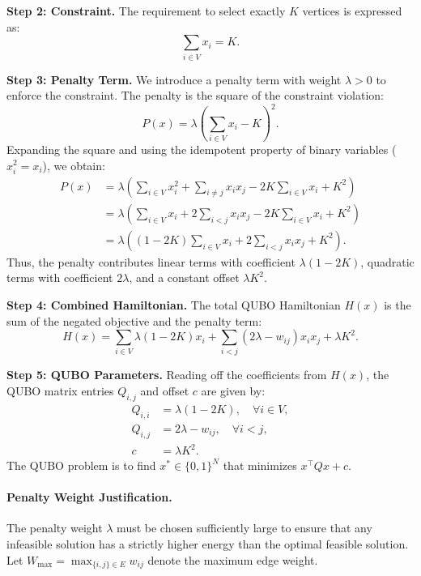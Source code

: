 \documentclass[12pt]{article}
\begin{document}
\textbf{Step 2: Constraint.}
The requirement to select exactly $K$ vertices is expressed as:
\begin{equation}
    \sum_{i \in V} x_i = K.
\end{equation}

\textbf{Step 3: Penalty Term.}
We introduce a penalty term with weight $\lambda > 0$ to enforce the constraint. The penalty is the square of the constraint violation:
\begin{equation}
    P(x) = \lambda \left( \sum_{i \in V} x_i - K \right)^2.
\end{equation}
Expanding the square and using the idempotent property of binary variables ($x_i^2 = x_i$), we obtain:
\begin{align}
    P(x) &= \lambda \left( \sum_{i \in V} x_i^2 + \sum_{i \neq j} x_i x_j - 2K \sum_{i \in V} x_i + K^2 \right) \\
    &= \lambda \left( \sum_{i \in V} x_i + 2 \sum_{i < j} x_i x_j - 2K \sum_{i \in V} x_i + K^2 \right) \\
    &= \lambda \left( (1 - 2K) \sum_{i \in V} x_i + 2 \sum_{i < j} x_i x_j + K^2 \right).
\end{align}
Thus, the penalty contributes linear terms with coefficient $\lambda(1 - 2K)$, quadratic terms with coefficient $2\lambda$, and a constant offset $\lambda K^2$.

\textbf{Step 4: Combined Hamiltonian.}
The total QUBO Hamiltonian $H(x)$ is the sum of the negated objective and the penalty term:
\begin{equation}
    H(x) = \sum_{i \in V} \lambda(1 - 2K) x_i + \sum_{i < j} \left( 2\lambda - w_{ij} \right) x_i x_j + \lambda K^2.
\end{equation}

\textbf{Step 5: QUBO Parameters.}
Reading off the coefficients from $H(x)$, the QUBO matrix entries $Q_{i,j}$ and offset $c$ are given by:
\begin{align}
    Q_{i,i} &= \lambda(1 - 2K), \quad \forall i \in V, \\
    Q_{i,j} &= 2\lambda - w_{ij}, \quad \forall i < j, \\
    c &= \lambda K^2.
\end{align}
The QUBO problem is to find $x^* \in \{0,1\}^N$ that minimizes $x^\top Q x + c$.

\paragraph{Penalty Weight Justification.}
The penalty weight $\lambda$ must be chosen sufficiently large to ensure that any infeasible solution has a strictly higher energy than the optimal feasible solution. Let $W_{\max} = \max_{\{i,j\} \in E} w_{ij}$ denote the maximum edge weight.
\end{document}
